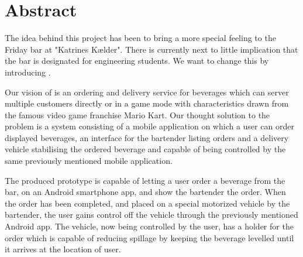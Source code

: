 
\chapter{Abstract}
\label{sec:Abstract}
The idea behind this project has been to bring a more special feeling to the Friday bar at "Katrines Kælder".
There is currently next to little implication that the bar is designated for engineering students.
We want to change this by introducing \systemName.

Our vision of \systemName is an ordering and delivery service for beverages which can server multiple customers directly or in a game mode with characteristics drawn from the famous video game franchise Mario Kart.
Our thought solution to the problem is a system consisting of a mobile application on which a user can order displayed beverages, an interface for the bartender listing orders and a delivery vehicle stabilising the ordered beverage and capable of being controlled by the same previously mentioned mobile application.

The produced prototype is capable of letting a user order a beverage from the bar, on an Android smartphone app, and show the bartender the order.
When the order has been completed, and placed on a special motorized vehicle by the bartender, the user gains control off the vehicle through the previously mentioned Android app.
The vehicle, now being controlled by the user, has a holder for the order which is capable of reducing spillage by keeping the beverage levelled until it arrives at the location of user.
